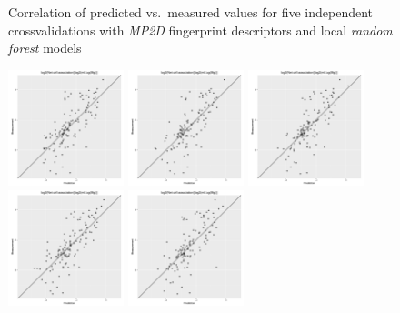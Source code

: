 \documentclass[utf8]{frontiersHLTH} %
\begin{document}
\begin{figure}[H]
\caption{Correlation of predicted vs.~measured values for five
independent crossvalidations with \emph{MP2D} fingerprint descriptors
and local \emph{random forest} models}

\label{fig:fingerprint}

\end{figure}

\begin{figure}[H]

\includegraphics[width=0.3000\textwidth]{figures/PCHEM-rf-0.pdf}\label{fig:pchem0}
\includegraphics[width=0.3000\textwidth]{figures/PCHEM-rf-1.pdf}\label{fig:pchem1}
\includegraphics[width=0.3000\textwidth]{figures/PCHEM-rf-2.pdf}\label{fig:pchem2}
\includegraphics[width=0.3000\textwidth]{figures/PCHEM-rf-3.pdf}\label{fig:pchem3}
\includegraphics[width=0.3000\textwidth]{figures/PCHEM-rf-4.pdf}\label{fig:pchem4}


\end{figure}
\end{document}
